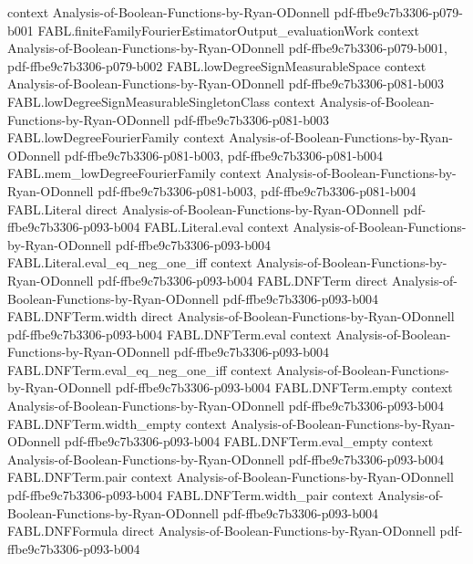 \begin{theorem}
  {context}
  {Analysis-of-Boolean-Functions-by-Ryan-ODonnell}
  {pdf-ffbe9c7b3306-p079-b001}
\proofstep
  {FABL.finiteFamilyFourierEstimatorOutput_evaluationWork}
  {context}
  {Analysis-of-Boolean-Functions-by-Ryan-ODonnell}
  {pdf-ffbe9c7b3306-p079-b001,
    pdf-ffbe9c7b3306-p079-b002}
\proofstep
  {FABL.lowDegreeSignMeasurableSpace}
  {context}
  {Analysis-of-Boolean-Functions-by-Ryan-ODonnell}
  {pdf-ffbe9c7b3306-p081-b003}
\proofstep
  {FABL.lowDegreeSignMeasurableSingletonClass}
  {context}
  {Analysis-of-Boolean-Functions-by-Ryan-ODonnell}
  {pdf-ffbe9c7b3306-p081-b003}
\proofstep
  {FABL.lowDegreeFourierFamily}
  {context}
  {Analysis-of-Boolean-Functions-by-Ryan-ODonnell}
  {pdf-ffbe9c7b3306-p081-b003,
    pdf-ffbe9c7b3306-p081-b004}
\proofstep
  {FABL.mem_lowDegreeFourierFamily}
  {context}
  {Analysis-of-Boolean-Functions-by-Ryan-ODonnell}
  {pdf-ffbe9c7b3306-p081-b003,
    pdf-ffbe9c7b3306-p081-b004}
\proofstep
  {FABL.Literal}
  {direct}
  {Analysis-of-Boolean-Functions-by-Ryan-ODonnell}
  {pdf-ffbe9c7b3306-p093-b004}
\proofstep
  {FABL.Literal.eval}
  {context}
  {Analysis-of-Boolean-Functions-by-Ryan-ODonnell}
  {pdf-ffbe9c7b3306-p093-b004}
\proofstep
  {FABL.Literal.eval_eq_neg_one_iff}
  {context}
  {Analysis-of-Boolean-Functions-by-Ryan-ODonnell}
  {pdf-ffbe9c7b3306-p093-b004}
\proofstep
  {FABL.DNFTerm}
  {direct}
  {Analysis-of-Boolean-Functions-by-Ryan-ODonnell}
  {pdf-ffbe9c7b3306-p093-b004}
\proofstep
  {FABL.DNFTerm.width}
  {direct}
  {Analysis-of-Boolean-Functions-by-Ryan-ODonnell}
  {pdf-ffbe9c7b3306-p093-b004}
\proofstep
  {FABL.DNFTerm.eval}
  {context}
  {Analysis-of-Boolean-Functions-by-Ryan-ODonnell}
  {pdf-ffbe9c7b3306-p093-b004}
\proofstep
  {FABL.DNFTerm.eval_eq_neg_one_iff}
  {context}
  {Analysis-of-Boolean-Functions-by-Ryan-ODonnell}
  {pdf-ffbe9c7b3306-p093-b004}
\proofstep
  {FABL.DNFTerm.empty}
  {context}
  {Analysis-of-Boolean-Functions-by-Ryan-ODonnell}
  {pdf-ffbe9c7b3306-p093-b004}
\proofstep
  {FABL.DNFTerm.width_empty}
  {context}
  {Analysis-of-Boolean-Functions-by-Ryan-ODonnell}
  {pdf-ffbe9c7b3306-p093-b004}
\proofstep
  {FABL.DNFTerm.eval_empty}
  {context}
  {Analysis-of-Boolean-Functions-by-Ryan-ODonnell}
  {pdf-ffbe9c7b3306-p093-b004}
\proofstep
  {FABL.DNFTerm.pair}
  {context}
  {Analysis-of-Boolean-Functions-by-Ryan-ODonnell}
  {pdf-ffbe9c7b3306-p093-b004}
\proofstep
  {FABL.DNFTerm.width_pair}
  {context}
  {Analysis-of-Boolean-Functions-by-Ryan-ODonnell}
  {pdf-ffbe9c7b3306-p093-b004}
\proofstep
  {FABL.DNFFormula}
  {direct}
  {Analysis-of-Boolean-Functions-by-Ryan-ODonnell}
  {pdf-ffbe9c7b3306-p093-b004}

\end{theorem}
